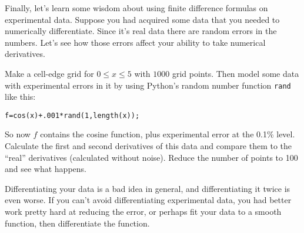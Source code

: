 Finally, let's learn some wisdom about using finite difference
formulas on experimental data. Suppose you had acquired some data
that you needed to numerically differentiate. Since it's real data
there are random errors in the numbers.  Let's see how those errors
affect your ability to take numerical derivatives. 
\begin{enumerate}
\prob \label{P:1.DerivExper} 

    Make a cell-edge grid for $0 \le x \le 5$ with $1000$ grid
    points. Then model some data with experimental errors in it
    by using Python's random number function {\tt rand} like
    this:
\begin{Verbatim}
f=cos(x)+.001*rand(1,length(x));
\end{Verbatim}
    So now $f$ contains the cosine function, plus experimental
    error at the 0.1\% level.  Calculate the first and second
    derivatives of this data and compare them to the ``real''
    derivatives (calculated without noise). Reduce the number of
    points to 100 and see what happens.
\end{enumerate}
Differentiating your data is a bad idea in general, and
differentiating it twice is even worse. If you can't avoid
differentiating experimental data, you had better work pretty
hard at reducing the error, or perhaps fit your data to a
smooth function, then differentiate the function.
